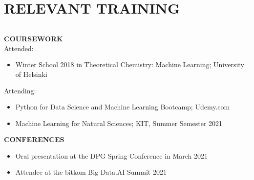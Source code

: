{\begin{minipage}[t][\textheight-2\fboxsep-2\fboxrule][t]{.6\textwidth}
\section*{RELEVANT TRAINING} \vskip -3.5mm {\color{lightgray}\hrule} \vskip 3.5mm
\textbf{\uppercase {coursework}} \\
Attended:
\begin{itemize}[noitemsep,topsep=0pt]
\item  Winter School 2018 in Theoretical Chemistry: Machine Learning; University of Helsinki
\end{itemize}
Attending:
\begin{itemize}[noitemsep,topsep=0pt]
\item Python for Data Science and Machine Learning Bootcamp; Udemy.com
\item Machine Learning for Natural Sciences; KIT, Summer Semester 2021
\end{itemize}  \vspace{0.23cm}
\textbf{\uppercase {CONFERENCES}}
\begin{itemize}[noitemsep,topsep=0pt]
	\item Oral presentation at the DPG Spring Conference in March 2021
	\item Attendee at the bitkom Big-Data.AI Summit 2021
\end{itemize}  \vspace{0.23cm}


\end{minipage}
}

%


